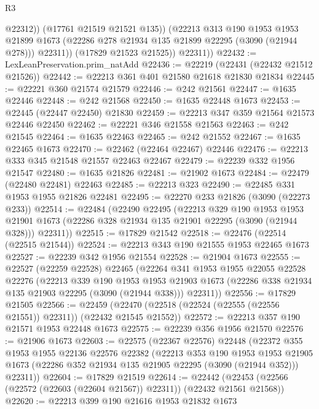 \begin{lexlean}{R3}
\begin{coremodule}
                  @22312))
              (@17761 @21519 @21521 @135))
            (@22213
              @313
              @190
              @1953
              @1953
              @21899
              @1673
              (@22286 @278 @21934 @135 @21899 @22295 (@3090 (@21944 @278)))
              @22311))
          (@17829 @21523 @21525))
        @22311))
@22432 := LexLeanPreservation.prim_natAdd
@22436 := @22219 (@22431 (@22432 @21512 @21526))
@22442 := @22213 @361 @401 @21580 @21618 @21830 @21834
@22445 := @22221 @360 @21574 @21579
@22446 := @242 @21561
@22447 := @1635 @22446
@22448 := @242 @21568
@22450 := @1635 @22448 @1673
@22453 := @22445 (@22447 @22450) @21830
@22459 := @22213 @347 @359 @21564 @21573 @22446 @22450
@22462 := @22221 @346 @21558 @21563
@22463 := @242 @21545
@22464 := @1635 @22463
@22465 := @242 @21552
@22467 := @1635 @22465 @1673
@22470 := @22462 (@22464 @22467) @22446
@22476 := @22213 @333 @345 @21548 @21557 @22463 @22467
@22479 := @22239 @332 @1956 @21547
@22480 := @1635 @21826
@22481 := @21902 @1673
@22484 := @22479 (@22480 @22481) @22463
@22485 := @22213 @323
@22490 := @22485 @331 @1953 @1955 @21826 @22481
@22495 := @22270 @233 @21826 (@3090 (@22273 @233))
@22514 := @22484
    (@22490
      @22495
      (@22213
        @329
        @190
        @1953
        @1953
        @21901
        @1673
        (@22286 @328 @21934 @135 @21901 @22295 (@3090 (@21944 @328)))
        @22311))
@22515 := @17829 @21542
@22518 := @22476 (@22514 (@22515 @21544))
@22524 := @22213 @343 @190 @21555 @1953 @22465 @1673
@22527 := @22239 @342 @1956 @21554
@22528 := @21904 @1673
@22555 := @22527
    (@22259 @22528)
    @22465
    (@22264
      @341
      @1953
      @1955
      @22055
      @22528
      @22276
      (@22213
        @339
        @190
        @1953
        @1953
        @21903
        @1673
        (@22286 @338 @21934 @135 @21903 @22295 (@3090 (@21944 @338)))
        @22311))
@22556 := @17829 @21505
@22566 := @22459 (@22470 (@22518 (@22524 (@22555 (@22556 @21551)) @22311)) (@22432 @21545 @21552))
@22572 := @22213 @357 @190 @21571 @1953 @22448 @1673
@22575 := @22239 @356 @1956 @21570
@22576 := @21906 @1673
@22603 := @22575
    (@22367 @22576)
    @22448
    (@22372
      @355
      @1953
      @1955
      @22136
      @22576
      @22382
      (@22213
        @353
        @190
        @1953
        @1953
        @21905
        @1673
        (@22286 @352 @21934 @135 @21905 @22295 (@3090 (@21944 @352)))
        @22311))
@22604 := @17829 @21519
@22614 := @22442 (@22453 (@22566 (@22572 (@22603 (@22604 @21567)) @22311)) (@22432 @21561 @21568))
@22620 := @22213 @399 @190 @21616 @1953 @21832 @1673

\end{coremodule}
\end{lexlean}
